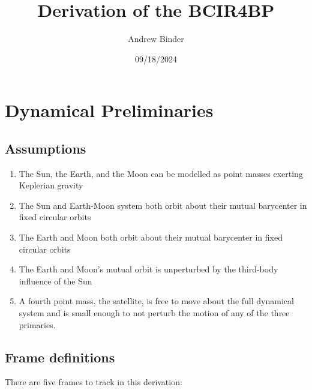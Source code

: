 \documentclass[]{article}
\title{Derivation of the BCIR4BP}
\author{Andrew Binder}
\date{09/18/2024}
\begin{document}
	\maketitle
	
	\section{Dynamical Preliminaries}
	\subsection{Assumptions}
	\begin{enumerate}
		\item The Sun, the Earth, and the Moon can be modelled as point masses exerting Keplerian gravity
		\item The Sun and Earth-Moon system both orbit about their mutual barycenter in fixed circular orbits
		\item The Earth and Moon both orbit about their mutual barycenter in fixed circular orbits
		\item The Earth and Moon's mutual orbit is unperturbed by the third-body influence of the Sun
		\item A fourth point mass, the satellite, is free to move about the full dynamical system and is small enough to not perturb the motion of any of the three primaries.
	\end{enumerate}
	
	\subsection{Frame definitions}
	
	There are five frames to track in this derivation:
	
\end{document}
